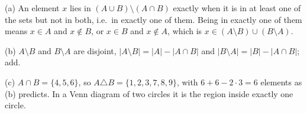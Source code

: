 (a) An element $x$ lies in $(A\cup B)\setminus(A\cap B)$ exactly when it is in at least one of the sets but not in both, i.e.\ in exactly one of them. Being in exactly one of them means $x\in A$ and $x\notin B$, or $x\in B$ and $x\notin A$, which is $x\in(A\setminus B)\cup(B\setminus A)$.

(b) $A\setminus B$ and $B\setminus A$ are disjoint, $|A\setminus B|=|A|-|A\cap B|$ and $|B\setminus A|=|B|-|A\cap B|$; add.

(c) $A\cap B=\{4,5,6\}$, so $A\triangle B=\boxed{\{1,2,3,7,8,9\}}$, with $6+6-2\cdot3=6$ elements as (b) predicts. In a Venn diagram of two circles it is the region inside exactly one circle.
